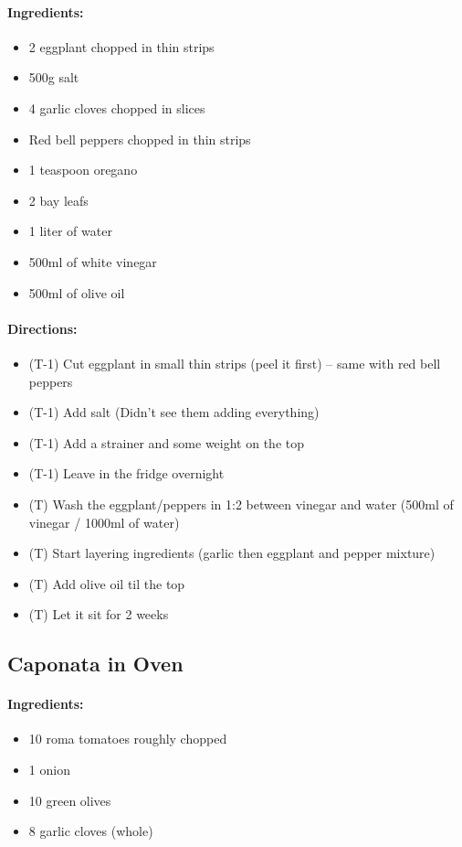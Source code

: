 \documentclass{article}
\begin{document}
\paragraph{Ingredients:}

\begin{itemize}
	\item 2 eggplant chopped in thin strips
	\item 500g salt
	\item 4 garlic cloves chopped in slices
	\item Red bell peppers chopped in thin strips
	\item 1 teaspoon oregano
	\item 2 bay leafs
	\item 1 liter of water
	\item 500ml of white vinegar
	\item 500ml of olive oil
\end{itemize}

\paragraph{Directions:}
\begin{itemize}
	\item (T-1) Cut eggplant in small thin strips (peel it first) -- same with red bell peppers
	\item (T-1) Add salt (Didn't see them adding everything)
	\item (T-1) Add a strainer and some weight on the top
	\item (T-1) Leave in the fridge overnight
	\item (T) Wash the eggplant/peppers in 1:2 between vinegar and water (500ml of vinegar / 1000ml of water)
	\item (T) Start layering ingredients (garlic then eggplant and pepper mixture)
	\item (T) Add olive oil til the top
	\item (T) Let it sit for 2 weeks
\end{itemize}

\subsection{Caponata in Oven}
\paragraph{Ingredients:}

\begin{itemize}
	\item 10 roma tomatoes roughly chopped
	\item 1 onion
	\item 10 green olives
	\item 8 garlic cloves (whole)
\end{itemize}
\end{document}
